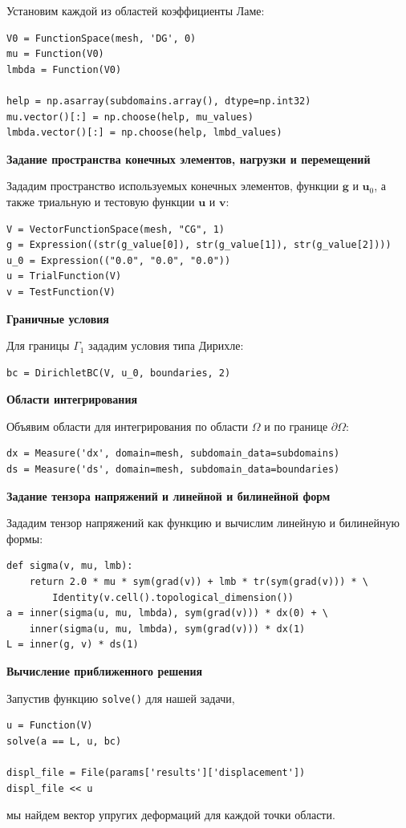 \documentclass[a4paper, 14pt]{extreport}
\begin{document}
Установим каждой из областей коэффициенты Ламе:
\begin{lstlisting}
V0 = FunctionSpace(mesh, 'DG', 0)
mu = Function(V0)
lmbda = Function(V0)

help = np.asarray(subdomains.array(), dtype=np.int32)
mu.vector()[:] = np.choose(help, mu_values)
lmbda.vector()[:] = np.choose(help, lmbd_values)
\end{lstlisting}

\textbf{Задание пространства конечных элементов, нагрузки и перемещений}

Зададим пространство используемых конечных элементов,
функции $\textbf{g}$ и $\textbf{u}_0$, а также триальную и тестовую
функции $\textbf{u}$ и $\textbf{v}$:
\begin{lstlisting}
V = VectorFunctionSpace(mesh, "CG", 1)
g = Expression((str(g_value[0]), str(g_value[1]), str(g_value[2])))
u_0 = Expression(("0.0", "0.0", "0.0"))
u = TrialFunction(V)
v = TestFunction(V)
\end{lstlisting}

\textbf{Граничные условия}

Для границы $\Gamma_1$ зададим условия типа Дирихле:
\begin{lstlisting}
bc = DirichletBC(V, u_0, boundaries, 2)
\end{lstlisting}

\textbf{Области интегрирования}

Объявим области для интегрирования по области $\Omega$ и по границе
$\partial\Omega$:
\begin{lstlisting}
dx = Measure('dx', domain=mesh, subdomain_data=subdomains)
ds = Measure('ds', domain=mesh, subdomain_data=boundaries)
\end{lstlisting}

\textbf{Задание тензора напряжений и линейной и билинейной форм}

Зададим тензор напряжений как функцию и вычислим линейную и билинейную формы:
\begin{lstlisting}
def sigma(v, mu, lmb):
    return 2.0 * mu * sym(grad(v)) + lmb * tr(sym(grad(v))) * \
        Identity(v.cell().topological_dimension())
a = inner(sigma(u, mu, lmbda), sym(grad(v))) * dx(0) + \
    inner(sigma(u, mu, lmbda), sym(grad(v))) * dx(1)
L = inner(g, v) * ds(1)
\end{lstlisting}

\textbf{Вычисление приближенного решения}

Запустив функцию \texttt{solve()} для нашей задачи,
\begin{lstlisting}
u = Function(V)
solve(a == L, u, bc)

displ_file = File(params['results']['displacement'])
displ_file << u
\end{lstlisting}
мы найдем вектор упругих деформаций для каждой точки области.
\end{document}
